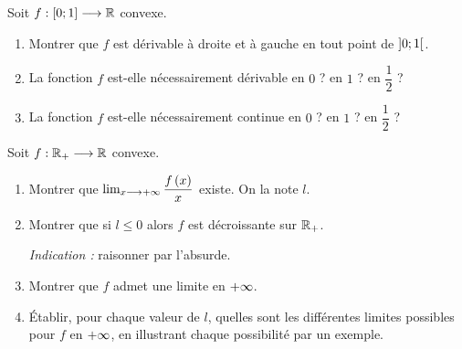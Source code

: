 \begin{corr}
\end{corr}

\begin{exo}[Exercice 18]
Soit \(f:\left[0;1\right]\longrightarrow\mathbb{R}\) convexe.

\begin{enumerate}
\item Montrer que \(f\) est dérivable à droite et à gauche en tout point de \(\left]0;1\right[\). \\

\item La fonction \(f\) est-elle nécessairement dérivable en \(0\) ? en \(1\) ? en \(\dfrac{1}{2}\) ? \\

\item La fonction \(f\) est-elle nécessairement continue en \(0\) ? en \(1\) ? en \(\dfrac{1}{2}\) ?
\end{enumerate}
\end{exo}

\begin{corr}
\end{corr}

\begin{exo}[Exercice 19]
Soit \(f:\mathbb{R}_+\longrightarrow\mathbb{R}\) convexe.

\begin{enumerate}
\item Montrer que \(\lim_{x\longrightarrow+\infty}\dfrac{f\left(x\right)}{x}\) existe. On la note \(l\). \\

\item Montrer que si \(l\leq0\) alors \(f\) est décroissante sur \(\mathbb{R}_+\).

\textit{Indication :} raisonner par l'absurde. \\

\item Montrer que \(f\) admet une limite en \(+\infty\). \\

\item Établir, pour chaque valeur de \(l\), quelles sont les différentes limites possibles pour \(f\) en \(+\infty\), en illustrant chaque possibilité par un exemple.
\end{enumerate}
\end{exo}

\begin{corr}
\end{corr}

